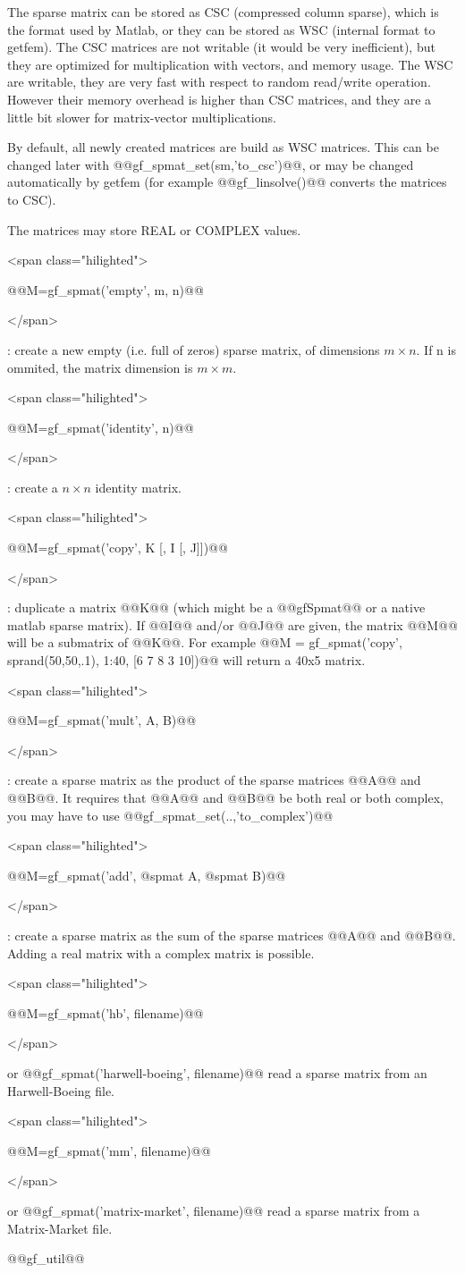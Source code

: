 \documentclass[11pt,a4paper]{article}
\newcommand{\newpage}{}
\newcommand{\hil}[1]{\begin{rawxml}<span class="hilighted">\end{rawxml}#1\begin{rawxml}</span>\end{rawxml}}
\newcommand{\sep}[1]{\medskip\par\hil{#1}}
\newcommand{\hil}[1]{\colorbox{sepbg}{#1}}
\newcommand{\sep}[1]{\medskip\par#1}
\begin{document}
\begin{cmddescription}
  The sparse matrix can be stored as CSC (compressed column sparse), which
  is the format used by Matlab, or they can be stored as WSC (internal format to
  getfem). The CSC matrices are not writable (it would be very inefficient), but
  they are optimized for multiplication with vectors, and memory usage. The WSC
  are writable, they are very fast with respect to random read/write operation.
  However their memory overhead is higher than CSC matrices, and they are a
  little bit slower for matrix-vector multiplications.

  By default, all newly created matrices are build as WSC matrices. This can
  be changed later with @@gf_spmat_set(sm,'to_csc')@@, or may be changed
  automatically by getfem (for example @@gf_linsolve()@@ converts the matrices to
  CSC).

  The matrices may store REAL or COMPLEX values.

  \sep{@@M=gf_spmat('empty', m, n)@@} : create a new empty (i.e. full of zeros) sparse matrix, of dimensions $m\times n$.
  If n is ommited, the matrix dimension is $m\times m$.

  \sep{@@M=gf_spmat('identity', n)@@} : create a $n\times n$ identity matrix.

  \sep{@@M=gf_spmat('copy', K [, I [, J]])@@} : duplicate a matrix @@K@@ (which might be a @@gfSpmat@@ or a native matlab sparse
  matrix). If @@I@@ and/or @@J@@ are given, the matrix @@M@@ will be a submatrix of @@K@@. For
  example @@M = gf_spmat('copy', sprand(50,50,.1), 1:40, [6 7 8 3 10])@@ will return a 40x5 matrix.
  
  \sep{@@M=gf_spmat('mult', A, B)@@} : create a sparse matrix as the product of the sparse matrices @@A@@ and @@B@@.  It
  requires that @@A@@ and @@B@@ be both real or both complex, you may have to use
  @@gf_spmat_set(..,'to_complex')@@

  \sep{@@M=gf_spmat('add', @spmat A, @spmat B)@@} : create a sparse matrix as the sum of the sparse matrices @@A@@ and @@B@@. Adding a
  real matrix with a complex matrix is possible.

  \sep{@@M=gf_spmat('hb', filename)@@} or @@gf_spmat('harwell-boeing', filename)@@ read a sparse matrix from an Harwell-Boeing file.

  \sep{@@M=gf_spmat('mm', filename)@@} or @@gf_spmat('matrix-market', filename)@@ read a sparse matrix from a Matrix-Market file.
\end{cmddescription}
\begin{gfseealso}
  @@gf\_util@@
\end{gfseealso}
\newpage
\end{document}
